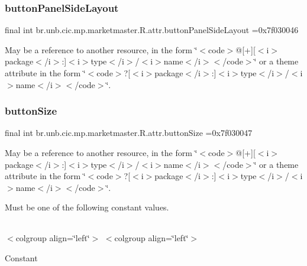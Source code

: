 \subsubsection{\texorpdfstring{button\+Panel\+Side\+Layout}{buttonPanelSideLayout}}
{\footnotesize\ttfamily final int br.\+unb.\+cic.\+mp.\+marketmaster.\+R.\+attr.\+button\+Panel\+Side\+Layout =0x7f030046\hspace{0.3cm}{\ttfamily [static]}}

May be a reference to another resource, in the form \char`\"{}$<$code$>$@\mbox{[}+\mbox{]}\mbox{[}$<$i$>$package$<$/i$>$\+:\mbox{]}$<$i$>$type$<$/i$>$/$<$i$>$name$<$/i$>$$<$/code$>$\char`\"{} or a theme attribute in the form \char`\"{}$<$code$>$?\mbox{[}$<$i$>$package$<$/i$>$\+:\mbox{]}$<$i$>$type$<$/i$>$/$<$i$>$name$<$/i$>$$<$/code$>$\char`\"{}. \mbox{\label{classbr_1_1unb_1_1cic_1_1mp_1_1marketmaster_1_1R_1_1attr_a228227b5d1639b512ef69c8478ff47a7}} 
\subsubsection{\texorpdfstring{button\+Size}{buttonSize}}
{\footnotesize\ttfamily final int br.\+unb.\+cic.\+mp.\+marketmaster.\+R.\+attr.\+button\+Size =0x7f030047\hspace{0.3cm}{\ttfamily [static]}}

May be a reference to another resource, in the form \char`\"{}$<$code$>$@\mbox{[}+\mbox{]}\mbox{[}$<$i$>$package$<$/i$>$\+:\mbox{]}$<$i$>$type$<$/i$>$/$<$i$>$name$<$/i$>$$<$/code$>$\char`\"{} or a theme attribute in the form \char`\"{}$<$code$>$?\mbox{[}$<$i$>$package$<$/i$>$\+:\mbox{]}$<$i$>$type$<$/i$>$/$<$i$>$name$<$/i$>$$<$/code$>$\char`\"{}. 

Must be one of the following constant values.

\tabulinesep=1mm
\begin{longtabu} spread 0pt [c]{*{0}{|X[-1]}|}
\hline
\end{longtabu}
$<$colgroup align=\char`\"{}left\char`\"{}$>$ $<$colgroup align=\char`\"{}left\char`\"{}$>$ 

Constant

